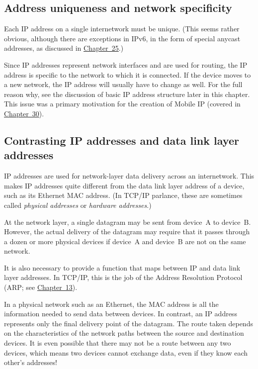 \subsection{Address uniqueness and network specificity}

Each IP address on a single internetwork must be unique.
(This seems rather obvious, although there are exceptions in IPv6, in the form of special anycast addresses, as discussed in \protect\hyperlink{ch25.html}{Chapter~25}.)

Since IP addresses represent network interfaces and are used for routing, the IP address is
specific to the network to which it is connected. If the device moves to
a new network, the IP address will usually have to change as well. For
the full reason why, see the discussion of basic IP address structure
later in this chapter. This issue was a primary motivation for the
creation of Mobile IP (covered in
\protect\hyperlink{ch30.html}{Chapter~30}).



\subsection{Contrasting IP addresses and data link layer addresses}

IP addresses are used for network-layer data delivery across an internetwork. This
makes IP addresses quite different from the data link layer address of a
device, such as its Ethernet MAC address. (In TCP/IP parlance, these are
sometimes called \emph{physical addresses} or \emph{hardware addresses}.)

At the network layer, a single datagram may be sent from device~A to device~B.
However, the actual delivery of the datagram may require that it passes through a dozen or more physical devices if device~A and device~B are not on the same network.

It is also necessary to provide a function that maps between IP and data link layer addresses.
In TCP/IP, this is the job of the Address Resolution Protocol (ARP; see \protect\hyperlink{ch13.html}{Chapter~13}).

In a physical network such as an Ethernet, the MAC address is all the
information needed to send data between devices. In contrast, an IP
address represents only the final delivery point of the datagram. The
route taken depends on the characteristics of the network paths between
the source and destination devices. It is even possible that there may
not be a route between any two devices, which means two devices cannot
exchange data, even if they know each other's addresses!




